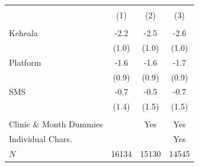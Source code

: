 \scriptsize{
\begin{tabular}{l*{3}{c}}
\hline\hline \\[-8pt]
\rowcolor{yellow!15}            &\multicolumn{1}{c}{(1)}&\multicolumn{1}{c}{(2)}&\multicolumn{1}{c}{(3)}\\
\hline \\[-8pt]
Keheala & -2.2\sym{*} & -2.5\sym{*} & -2.6\sym{*} \\
            &   (1.0) &   (1.0) &   (1.0)         \\
[0.4em]
Platform & -1.6 & -1.6 & -1.7 \\
            &   (0.9) &   (0.9) &   (0.9)         \\
[0.4em]
SMS & -0.7 & -0.5 & -0.7 \\
            &   (1.4) &   (1.5) &   (1.5)         \\
[0.4em]
\hline
\hline \\[-8pt]
Clinic \& Month Dummies & & Yes & Yes  \\
Individual Chars. & & & Yes  \\
\(N\)       &       16134         &       15130         &       14545         \\
\hline\hline
\end{tabular}
}